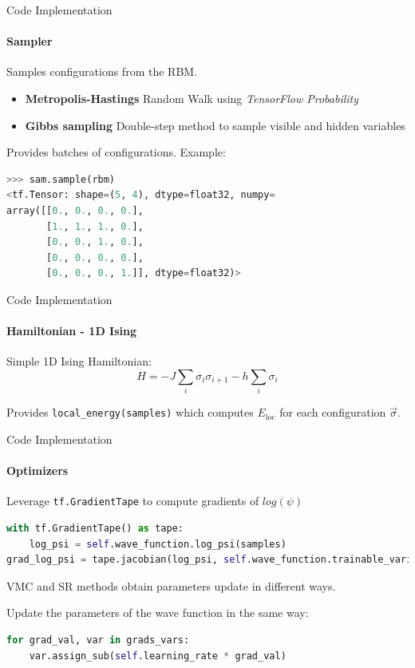 \documentclass{beamer}
\begin{document}
\begin{frame}[fragile]{Code Implementation}
\framesubtitle{Sampler}

Samples configurations from the RBM.

\begin{itemize}
    \item \textbf{Metropolis-Hastings} Random Walk using \textit{TensorFlow Probability}
    \item \textbf{Gibbs sampling} Double-step method to sample visible and hidden variables
\end{itemize}

Provides batches of configurations. Example:
\begin{center}
\begin{lstlisting}[language=Python, style=kaolstplain]
>>> sam.sample(rbm)
<tf.Tensor: shape=(5, 4), dtype=float32, numpy=
array([[0., 0., 0., 0.],
       [1., 1., 1., 0.],
       [0., 0., 1., 0.],
       [0., 0., 0., 0.],
       [0., 0., 0., 1.]], dtype=float32)>
\end{lstlisting}	
\end{center}

\end{frame}

\begin{frame}[fragile]{Code Implementation}
\framesubtitle{Hamiltonian - 1D Ising}

Simple 1D Ising Hamiltonian:
$$ H = -J \sum_{i} \sigma_{i} \sigma_{i+1} - h \sum_{i} \sigma_{i} $$

Provides \lstinline[style=kaolstplain]|local_energy(samples)| which computes $E_{\text{loc}}$ for each configuration $\vec{\sigma}$.

\end{frame}

\begin{frame}[fragile]{Code Implementation}
\framesubtitle{Optimizers}
Leverage \lstinline[style=kaolstplain]|tf.GradientTape| to compute gradients of $log\left(\psi\right)$
\begin{lstlisting}[language=Python, style=kaolstplain]
with tf.GradientTape() as tape:
	log_psi = self.wave_function.log_psi(samples)
grad_log_psi = tape.jacobian(log_psi, self.wave_function.trainable_variables)
\end{lstlisting}
\baselineskip

VMC and SR methods obtain parameters update in different ways.
\baselineskip

Update the parameters of the wave function in the same way:
\begin{lstlisting}[language=Python, style=kaolstplain]
for grad_val, var in grads_vars:
	var.assign_sub(self.learning_rate * grad_val)
\end{lstlisting}
\end{frame}
\end{document}
